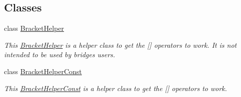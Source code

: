 \subsection*{Classes}
\begin{DoxyCompactItemize}
\item 
class \hyperlink{classbridges_1_1datastructure_1_1_grid_1_1_bracket_helper}{Bracket\+Helper}
\begin{DoxyCompactList}\small\item\em This \hyperlink{classbridges_1_1datastructure_1_1_grid_1_1_bracket_helper}{Bracket\+Helper} is a helper class to get the \mbox{[}\mbox{]} operators to work. It is not intended to be used by bridges users. \end{DoxyCompactList}\item 
class \hyperlink{classbridges_1_1datastructure_1_1_grid_1_1_bracket_helper_const}{Bracket\+Helper\+Const}
\begin{DoxyCompactList}\small\item\em This \hyperlink{classbridges_1_1datastructure_1_1_grid_1_1_bracket_helper_const}{Bracket\+Helper\+Const} is a helper class to get the \mbox{[}\mbox{]} operators to work. \end{DoxyCompactList}\end{DoxyCompactItemize}

